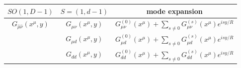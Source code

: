 \begin{tabular}{|c|c|c|}
	\hline
	$SO(1,D-1)$                                          & $S=(1,d-1)$            & mode expansion                                                                              \\ \hline
	\multirow{3}{*}{$G_{\hat{\mu}\hat{\nu}} (x^\mu, y)$} & $G_{\mu\nu}(x^\mu, y)$ & $G^{(0)}_{{\mu} {\nu}} (x^\mu)+ \sum_{s \neq 0} G^{(s)}_{{\mu} {\nu}} (x^\mu) e^{is y / R}$ \\ \cline{2-3}
	                                                     & $G_{\mu d}(x^\mu, y)$  & $G^{(0)}_{{\mu} {d}} (x^\mu)+ \sum_{s \neq 0} G^{(s)}_{{\mu} {d}} (x^\mu) e^{is y / R}$     \\ \cline{2-3}
	                                                     & $G_{dd}(x^\mu, y)$     & $G^{(0)}_{{d} {d}} (x^\mu)+ \sum_{s \neq 0} G^{(s)}_{{d} {d}} (x^\mu) e^{is y / R}$         \\ \hline
\end{tabular}